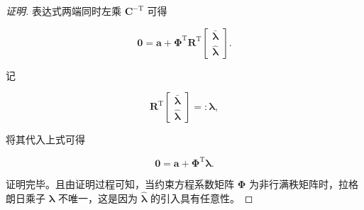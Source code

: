 \begin{proof}[证明]
表达式两端同时左乘 $\boldsymbol{C}^{-\mathrm{T}}$ 可得

\[
\boldsymbol{0}=\boldsymbol{a}+\boldsymbol{\Phi}^{\mathrm{T}}\boldsymbol{R}^{\mathrm{T}}\begin{bmatrix}\bar{\boldsymbol{\lambda}}\\\hat{\boldsymbol{\lambda}}\end{bmatrix}.
\]

记

\[
\boldsymbol{R}^{\mathrm{T}}\begin{bmatrix}\bar{\boldsymbol{\lambda}}\\\hat{\boldsymbol{\lambda}}\end{bmatrix}=:\boldsymbol{\lambda},
\]

将其代入上式可得

\[
\boldsymbol{0}=\boldsymbol{a}+\boldsymbol{\Phi}^{\mathrm{T}}\boldsymbol{\lambda}.
\]

证明完毕。且由证明过程可知，当约束方程系数矩阵 $\boldsymbol{\Phi}$ 为非行满秩矩阵时，拉格朗日乘子 $\boldsymbol{\lambda}$ 不唯一，这是因为 $\hat{\boldsymbol{\lambda}}$ 的引入具有任意性。
\end{proof}
